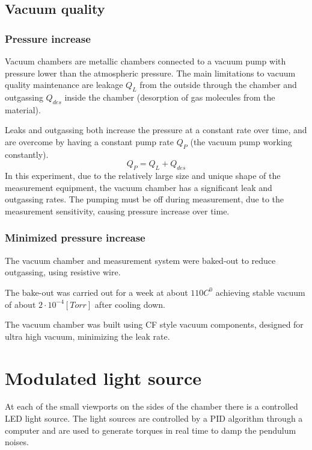 \documentclass[\main/master.tex]{subfiles}
\begin{document}
\subsection{Vacuum quality}
\subsubsection{Pressure increase}
\par\noindent
Vacuum chambers are metallic chambers connected to a vacuum pump with pressure lower than the atmospheric pressure. The main limitations to vacuum quality maintenance are leakage $Q_L$ from the outside through the chamber and outgassing $Q_{des}$ inside the chamber (desorption of gas molecules from the material).
\par\noindent
Leaks and outgassing both increase the pressure at a constant rate over time, and are overcome by having a constant pump rate $Q_P$ (the vacuum pump working constantly).   
\begin{equation}
Q_P = Q_L + Q_{des}  \label{eqn:vacuum_equilibrium}
\end{equation}
In this experiment, due to the relatively large size and unique shape of the measurement equipment, the vacuum chamber has a significant leak and outgassing rates. The pumping must be off during measurement, due to the measurement sensitivity, causing pressure increase over time.
\subsubsection{Minimized pressure increase}
\par\noindent
The vacuum chamber and measurement system were baked-out to reduce outgassing, using resistive wire. 
\par\noindent
The bake-out was carried out for a week at about $110 C^0$ achieving stable vacuum of about $2\cdot 10^{−4} [Torr]$ after cooling down.
\par\noindent
The vacuum chamber was built using CF style vacuum components, designed for ultra high vacuum, minimizing the leak rate.

\section{Modulated light source}
At each of the small viewports on the sides of the chamber there is a controlled LED light source. The light sources are controlled by a PID algorithm through a computer and are used to generate torques in real time to damp the pendulum noises.
\end{document}

